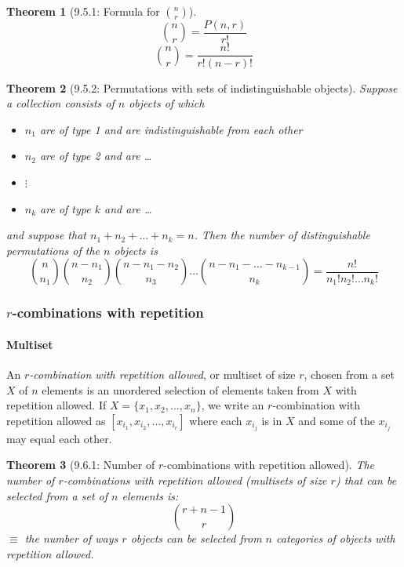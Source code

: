 \documentclass{article}
\theoremstyle{plain}
\newtheorem{theorem}{Theorem}[section]
\theoremstyle{definition}
\theoremstyle{remark}
\begin{document}
\begin{theorem}[9.5.1: Formula for $\binom{n}{r}$]
    \[ \binom{n}{r} = \frac{P(n,r)}{r!} \]
    \[ \binom{n}{r} = \frac{n!}{r!(n-r)!} \]
\end{theorem}
 
\begin{theorem}[9.5.2: Permutations with sets of indistinguishable objects]
    Suppose a collection consists of $n$ objects of which
    \begin{itemize}
        \item $n_1$ are of type 1 and are indistinguishable from each other
        \item $n_2$ are of type 2 and are \dots
        \item $\vdots$
        \item $n_k$ are of type $k$ and are \dots
    \end{itemize}
    and suppose that $n_1 + n_2 + \dots + n_k = n$. Then the number of distinguishable permutations of the $n$ objects is
    \[ \binom{n}{n_1}\binom{n-n_1}{n_2}\binom{n-n_1-n_2}{n_3} \dots \binom{n-n_1-\dots-n_{k-1}}{n_k} = \frac{n!}{n_1! n_2! \dots n_k!} \]
\end{theorem}
 
\subsubsection*{$r$-combinations with repetition}
 
\paragraph{Multiset}
An \emph{$r$-combination with repetition allowed}, or multiset of size $r$, chosen from a set $X$ of $n$ elements is an unordered selection of elements taken from $X$ with repetition allowed. If $X = \{x_1, x_2, \dots, x_n\}$, we write an $r$-combination with repetition allowed as $[x_{i_1}, x_{i_2}, \dots, x_{i_r}]$ where each $x_{i_j}$ is in $X$ and some of the $x_{i_j}$ may equal each other.
 
\begin{theorem}[9.6.1: Number of $r$-combinations with repetition allowed]
    The number of $r$-combinations with repetition allowed (multisets of size $r$) that can be selected from a set of $n$ elements is:
    \[ \binom{r+n-1}{r} \]
    $\equiv$ the number of ways $r$ objects can be selected from $n$ categories of objects with repetition allowed.
\end{theorem}
 
\end{document}
